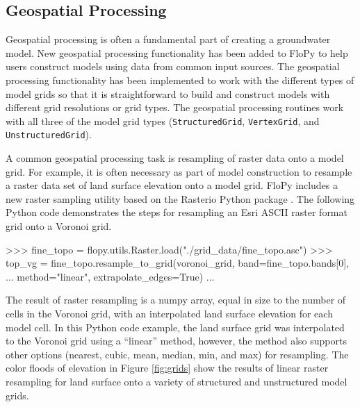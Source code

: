 \documentclass[11pt, oneside]{article}  	%
\begin{document}
\subsection{Geospatial Processing}

Geospatial processing is often a fundamental part of creating a groundwater model. New geospatial processing functionality has been added to FloPy to help users construct models using data from common input sources. The geospatial processing functionality has been implemented to work with the different types of model grids so that it is straightforward to build and construct models with different grid resolutions or grid types. The geospatial processing routines work with all three of the model grid types (\texttt{StructuredGrid}, \texttt{VertexGrid}, and \texttt{UnstructuredGrid}). 

A common geospatial processing task is resampling of raster data onto a model grid. For example, it is often necessary as part of model construction to resample a raster data set of land surface elevation onto a model grid. FloPy includes a new raster sampling utility based on the Rasterio Python package \citep{gillies_2019}. The following Python code demonstrates the steps for resampling an Esri ASCII raster format grid onto a Voronoi grid.

\begin{python}
>>> fine_topo = flopy.utils.Raster.load("./grid_data/fine_topo.asc")
>>> top_vg = fine_topo.resample_to_grid(voronoi_grid, band=fine_topo.bands[0],
... method="linear", extrapolate_edges=True)
...
\end{python}

\noindent The result of raster resampling is a numpy array, equal in size to the number of cells in the Voronoi grid, with an interpolated land surface elevation for each model cell. In this Python code example, the land surface grid was interpolated to the Voronoi grid using a ``linear'' method, however, the method also supports other options (nearest, cubic, mean, median, min, and max) for resampling. The color floods of elevation in Figure \ref{fig:grids} show the results of linear raster resampling for land surface onto a variety of structured and unstructured model grids.
\end{document}

